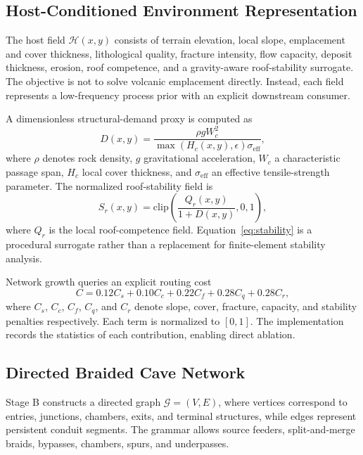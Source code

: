 \documentclass[conference]{IEEEtran}
\begin{document}
\subsection{Host-Conditioned Environment Representation}

The host field $\mathcal{H}(x,y)$ consists of terrain elevation, local slope, emplacement and cover thickness, lithological quality, fracture intensity, flow capacity, deposit thickness, erosion, roof competence, and a gravity-aware roof-stability surrogate. The objective is not to solve volcanic emplacement directly. Instead, each field represents a low-frequency process prior with an explicit downstream consumer.

A dimensionless structural-demand proxy is computed as
\begin{equation}
D(x,y)=\frac{\rho g W_c^2}{\max(H_c(x,y),\epsilon)\sigma_{\mathrm{eff}}},
\label{eq:demand}
\end{equation}
where $\rho$ denotes rock density, $g$ gravitational acceleration, $W_c$ a characteristic passage span, $H_c$ local cover thickness, and $\sigma_{\mathrm{eff}}$ an effective tensile-strength parameter. The normalized roof-stability field is
\begin{equation}
S_r(x,y)=\mathrm{clip}\left(\frac{Q_r(x,y)}{1+D(x,y)},0,1\right),
\label{eq:stability}
\end{equation}
where $Q_r$ is the local roof-competence field. Equation~\eqref{eq:stability} is a procedural surrogate rather than a replacement for finite-element stability analysis.

Network growth queries an explicit routing cost
\begin{equation}
C=0.12C_s+0.10C_c+0.22C_f+0.28C_q+0.28C_r,
\label{eq:routing}
\end{equation}
where $C_s$, $C_c$, $C_f$, $C_q$, and $C_r$ denote slope, cover, fracture, capacity, and stability penalties respectively. Each term is normalized to $[0,1]$. The implementation records the statistics of each contribution, enabling direct ablation.

\subsection{Directed Braided Cave Network}

Stage B constructs a directed graph $\mathcal{G}=(V,E)$, where vertices correspond to entries, junctions, chambers, exits, and terminal structures, while edges represent persistent conduit segments. The grammar allows source feeders, split-and-merge braids, bypasses, chambers, spurs, and underpasses.
\end{document}
